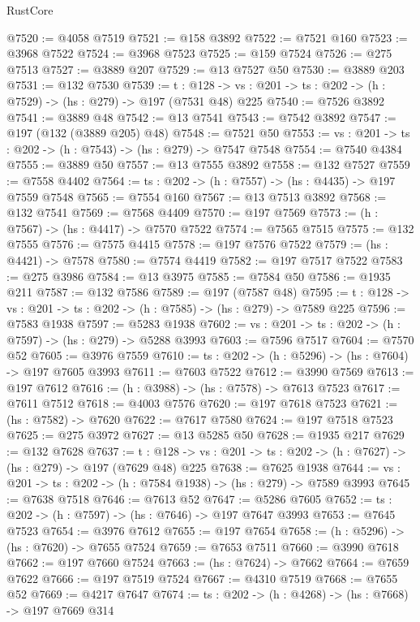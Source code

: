 \begin{lexlean}{RustCore}
\begin{coremodule}
@7520 := @4058 @7519
@7521 := @158 @3892
@7522 := @7521 @160
@7523 := @3968 @7522
@7524 := @3968 @7523
@7525 := @159 @7524
@7526 := @275 @7513
@7527 := @3889 @207
@7529 := @13 @7527 @50
@7530 := @3889 @203
@7531 := @132 @7530
@7539 := {t : @128} ->
  {vs : @201} -> {ts : @202} -> (h : @7529) -> (hs : @279) -> @197 (@7531 @48) @225
@7540 := @7526 @3892
@7541 := @3889 @48
@7542 := @13 @7541
@7543 := @7542 @3892
@7547 := @197 (@132 (@3889 @205) @48)
@7548 := @7521 @50
@7553 := {vs : @201} -> {ts : @202} -> (h : @7543) -> (hs : @279) -> @7547 @7548
@7554 := @7540 @4384
@7555 := @3889 @50
@7557 := @13 @7555 @3892
@7558 := @132 @7527
@7559 := @7558 @4402
@7564 := {ts : @202} -> (h : @7557) -> (hs : @4435) -> @197 @7559 @7548
@7565 := @7554 @160
@7567 := @13 @7513 @3892
@7568 := @132 @7541
@7569 := @7568 @4409
@7570 := @197 @7569
@7573 := (h : @7567) -> (hs : @4417) -> @7570 @7522
@7574 := @7565 @7515
@7575 := @132 @7555
@7576 := @7575 @4415
@7578 := @197 @7576 @7522
@7579 := (hs : @4421) -> @7578
@7580 := @7574 @4419
@7582 := @197 @7517 @7522
@7583 := @275 @3986
@7584 := @13 @3975
@7585 := @7584 @50
@7586 := @1935 @211
@7587 := @132 @7586
@7589 := @197 (@7587 @48)
@7595 := {t : @128} -> {vs : @201} -> {ts : @202} -> (h : @7585) -> (hs : @279) -> @7589 @225
@7596 := @7583 @1938
@7597 := @5283 @1938
@7602 := {vs : @201} -> {ts : @202} -> (h : @7597) -> (hs : @279) -> @5288 @3993
@7603 := @7596 @7517
@7604 := @7570 @52
@7605 := @3976 @7559
@7610 := {ts : @202} -> (h : @5296) -> (hs : @7604) -> @197 @7605 @3993
@7611 := @7603 @7522
@7612 := @3990 @7569
@7613 := @197 @7612
@7616 := (h : @3988) -> (hs : @7578) -> @7613 @7523
@7617 := @7611 @7512
@7618 := @4003 @7576
@7620 := @197 @7618 @7523
@7621 := (hs : @7582) -> @7620
@7622 := @7617 @7580
@7624 := @197 @7518 @7523
@7625 := @275 @3972
@7627 := @13 @5285 @50
@7628 := @1935 @217
@7629 := @132 @7628
@7637 := {t : @128} ->
  {vs : @201} -> {ts : @202} -> (h : @7627) -> (hs : @279) -> @197 (@7629 @48) @225
@7638 := @7625 @1938
@7644 := {vs : @201} -> {ts : @202} -> (h : @7584 @1938) -> (hs : @279) -> @7589 @3993
@7645 := @7638 @7518
@7646 := @7613 @52
@7647 := @5286 @7605
@7652 := {ts : @202} -> (h : @7597) -> (hs : @7646) -> @197 @7647 @3993
@7653 := @7645 @7523
@7654 := @3976 @7612
@7655 := @197 @7654
@7658 := (h : @5296) -> (hs : @7620) -> @7655 @7524
@7659 := @7653 @7511
@7660 := @3990 @7618
@7662 := @197 @7660 @7524
@7663 := (hs : @7624) -> @7662
@7664 := @7659 @7622
@7666 := @197 @7519 @7524
@7667 := @4310 @7519
@7668 := @7655 @52
@7669 := @4217 @7647
@7674 := {ts : @202} -> (h : @4268) -> (hs : @7668) -> @197 @7669 @314

\end{coremodule}
\end{lexlean}
